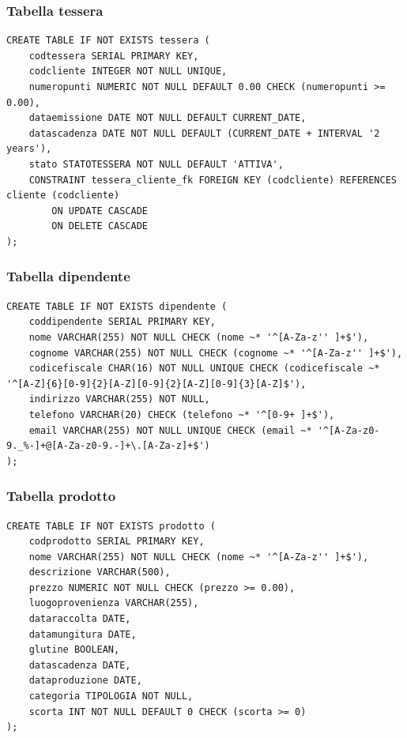 \documentclass[a4paper,12pt]{article}
\begin{document}
\subsubsection*{Tabella tessera}

\vspace{1.5em}
\begin{lstlisting}[style=sqlstyle]
CREATE TABLE IF NOT EXISTS tessera (
    codtessera SERIAL PRIMARY KEY,
    codcliente INTEGER NOT NULL UNIQUE,
    numeropunti NUMERIC NOT NULL DEFAULT 0.00 CHECK (numeropunti >= 0.00),
    dataemissione DATE NOT NULL DEFAULT CURRENT_DATE,
    datascadenza DATE NOT NULL DEFAULT (CURRENT_DATE + INTERVAL '2 years'),
    stato STATOTESSERA NOT NULL DEFAULT 'ATTIVA',
    CONSTRAINT tessera_cliente_fk FOREIGN KEY (codcliente) REFERENCES cliente (codcliente)
        ON UPDATE CASCADE
        ON DELETE CASCADE
);
\end{lstlisting}
\vspace{1.5em}
\subsubsection*{Tabella dipendente}

\vspace{1.5em}
\begin{lstlisting}[style=sqlstyle]
CREATE TABLE IF NOT EXISTS dipendente (
    coddipendente SERIAL PRIMARY KEY,
    nome VARCHAR(255) NOT NULL CHECK (nome ~* '^[A-Za-z'' ]+$'),
    cognome VARCHAR(255) NOT NULL CHECK (cognome ~* '^[A-Za-z'' ]+$'),
    codicefiscale CHAR(16) NOT NULL UNIQUE CHECK (codicefiscale ~* '^[A-Z]{6}[0-9]{2}[A-Z][0-9]{2}[A-Z][0-9]{3}[A-Z]$'),
    indirizzo VARCHAR(255) NOT NULL,
    telefono VARCHAR(20) CHECK (telefono ~* '^[0-9+ ]+$'),
    email VARCHAR(255) NOT NULL UNIQUE CHECK (email ~* '^[A-Za-z0-9._%-]+@[A-Za-z0-9.-]+\.[A-Za-z]+$')
);
\end{lstlisting}
\vspace{1.5em}
\subsubsection*{Tabella prodotto}

\vspace{1.5em}
\begin{lstlisting}[style=sqlstyle]
CREATE TABLE IF NOT EXISTS prodotto (
    codprodotto SERIAL PRIMARY KEY,
    nome VARCHAR(255) NOT NULL CHECK (nome ~* '^[A-Za-z'' ]+$'),
    descrizione VARCHAR(500),
    prezzo NUMERIC NOT NULL CHECK (prezzo >= 0.00),
    luogoprovenienza VARCHAR(255),
    dataraccolta DATE,
    datamungitura DATE,
    glutine BOOLEAN,
    datascadenza DATE,
    dataproduzione DATE,
    categoria TIPOLOGIA NOT NULL,
    scorta INT NOT NULL DEFAULT 0 CHECK (scorta >= 0)
);
\end{lstlisting}
\vspace{1.5em}
\end{document}
